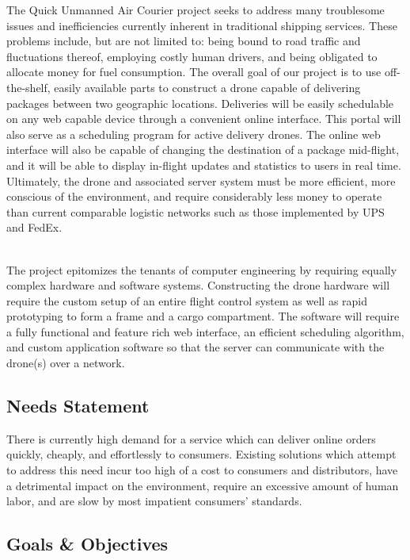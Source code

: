 \documentclass[12pt]{extarticle}
\begin{document}
The Quick Unmanned Air Courier project seeks to address many troublesome issues and inefficiencies currently inherent in traditional shipping services.  These problems include, but are not limited to: being bound to road traffic and fluctuations thereof, employing costly human drivers, and being obligated to allocate money for fuel consumption.  The overall goal of our project is to use off-the-shelf, easily available parts to construct a drone capable of delivering packages between two geographic locations.  Deliveries will be easily schedulable on any web capable device through a convenient online interface.  This portal will also serve as a scheduling program for active delivery drones.  The online web interface will also be capable of changing the destination of a package mid-flight, and it will be able to display in-flight updates and statistics to users in real time.  Ultimately, the drone and associated server system must be more efficient, more conscious of the environment, and require considerably less money to operate than current comparable logistic networks such as those implemented by UPS and FedEx.  

\ \\
The project epitomizes the tenants of computer engineering by requiring equally complex hardware and software systems.  Constructing the drone hardware will require the custom setup of an entire flight control system as well as rapid prototyping to form a frame and a cargo compartment.  The software will require a fully functional and feature rich web interface, an efficient scheduling algorithm, and custom application software so that the server can communicate with the drone(s) over a network. 

\subsection{Needs Statement}

There is currently high demand for a service which can deliver online orders quickly, cheaply, and effortlessly to consumers.  Existing solutions which attempt to address this need incur too high of a cost to consumers and distributors, have a detrimental impact on the environment, require an excessive amount of human labor, and are slow by most impatient consumers' standards. 


\subsection{Goals \& Objectives}
\end{document}
